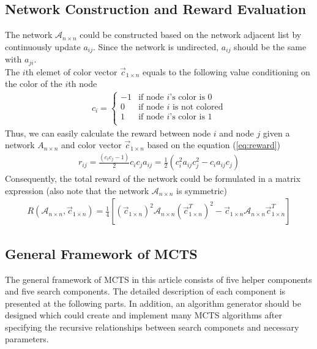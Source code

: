\documentclass{article}
\begin{document}
\subsection{Network Construction and Reward Evaluation}
The network $\mathcal{A}_{n \times n}$ could be constructed based on the network adjacent list by continuously update $a_{ij}$. Since the network is undirected, $a_{ij}$ should be the same with $a_{ji}$.\\

The $i$th elemet of color vector $\vec c_{1 \times n}$ equals to the following value conditioning on the color of the $i$th node
\begin{align}
  c_{i} = \left \{
             \begin{array}{cl}
               -1 & \mbox{if node $i$'s color is 0} \\
               0 & \mbox{if node $i$ is not colored} \\
               1 & \mbox{if node $i$'s color is 1} \\
             \end{array}
          \right.
\end{align}
Thus, we can easily calculate the reward between node $i$ and node $j$ given a network $A_{n \times n}$ and color vector $\vec c_{1 \times n}$ based on the equation (\ref{eq:reward})
\begin{equation}
\begin{aligned}
  \label{eq:reward}
  r_{ij} = \frac{(c_{i}c_{j} - 1)}{2} c_{i} c_{j} a_{ij} = \frac{1}{2} (c_{i}^{2}a_{ij}c_{j}^{2} - c_{i}a_{ij}c_{j})
\end{aligned}
\end{equation}
Consequently, the total reward of the network could be formulated in a matrix expression (also note that the network $\mathcal{A}_{n \times n}$ is symmetric)
\begin{equation}
\begin{aligned}
  R(\mathcal{A}_{n \times n}, \vec c_{1 \times n}) =  \frac{1}{4} [(\vec c_{1 \times n})^{2} \mathcal{A}_{n \times n} (\vec c_{1 \times n}^{T})^{2} - \vec c_{1 \times n} \mathcal{A}_{n \times n} \vec c_{1 \times n}^{T}]
\end{aligned}
\end{equation}

\subsection{General Framework of MCTS}
The general framework of MCTS in this article consists of five helper components and five search components. The detailed description of each component is presented at the following parts. In addition, an algorithm generator should be designed which could create and implement many MCTS algorithms after specifying the recursive relationships between search componets and necessary parameters.
\end{document}
